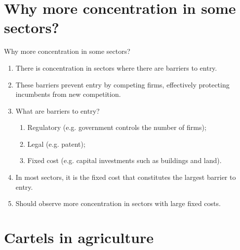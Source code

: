 \documentclass[table,xcolor=pdftex,dvipsnames]{beamer}\usepackage[]{graphicx}\usepackage[]{color}
\begin{document}
\section{Why more concentration in some sectors?}

\begin{frame}{Why more concentration in some sectors?}
\begin{enumerate}[label=\textbullet]
  \item There is concentration in sectors where there are barriers to entry.
  \item These barriers prevent entry by competing firms, effectively protecting incumbents from new competition.
  \item What are barriers to entry?
      \begin{enumerate}[label=-]
          \item Regulatory (e.g. government controls the number of firms);
          \item Legal (e.g. patent);
          \item Fixed cost (e.g. capital investments such as buildings and land).
      \end{enumerate}
  \item In most sectors, it is the fixed cost that constitutes the largest barrier to entry.
  \item Should observe more concentration in sectors with large fixed costs.
\end{enumerate}
\end{frame}

\section{Cartels in agriculture}
\end{document}
